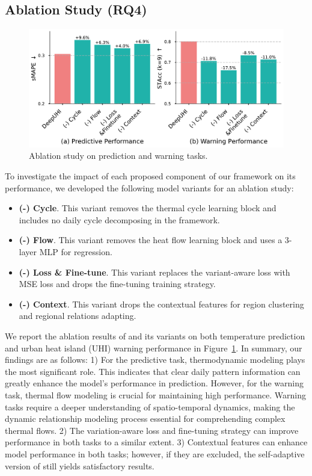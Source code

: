 \subsection{Ablation Study (RQ4)}
\begin{figure}[!b]
    \centering
    \vspace{-1em}
    \includegraphics[width=1\linewidth]{resources/ablation.pdf}
    \vspace{-2em}
    \caption{Ablation study on prediction and warning tasks.}
    \label{fig:ablation}
\end{figure}
To investigate the impact of each proposed component of our framework on its performance, we developed the following model variants for an ablation study:
\begin{itemize}[leftmargin=*]
    \item \textbf{(-) Cycle}. This variant removes the thermal cycle learning block and includes no daily cycle decomposing in the framework.
    \item \textbf{(-) Flow}. This variant removes the heat flow learning block and uses a 3-layer MLP for regression.
    \item \textbf{(-) Loss \& Fine-tune}. This variant replaces the variant-aware loss with MSE loss and drops the fine-tuning training strategy.
    \item \textbf{(-) Context}. This variant drops the contextual features for region clustering and regional relations adapting.
\end{itemize}

We report the ablation results of \model and its variants on both temperature prediction and urban heat island (UHI) warning performance in Figure~\ref{fig:ablation}. In summary, our findings are as follows: 1) For the predictive task, thermodynamic modeling plays the most significant role. This indicates that clear daily pattern information can greatly enhance the model's performance in prediction. However, for the warning task, thermal flow modeling is crucial for maintaining high performance. Warning tasks require a deeper understanding of spatio-temporal dynamics, making the dynamic relationship modeling process essential for comprehending complex thermal flows. 2) The variation-aware loss and fine-tuning strategy can improve performance in both tasks to a similar extent. 3) Contextual features can enhance model performance in both tasks; however, if they are excluded, the self-adaptive version of \model still yields satisfactory results.

